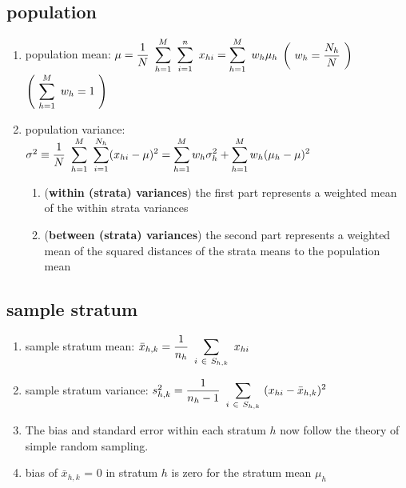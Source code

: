 \subsection{population}
\begin{enumerate}[itemsep=0.2cm]
    \item population mean: $
        \mu
        = \dfrac{1}{N} \ \displaystyle\sum_{h=1}^M \ \displaystyle\sum_{i=1}^n\  x_{hi}
        = \displaystyle\sum_{h=1}^M \ w_h\mu_h
    $
    \hfill
    $\left(\ w_h = \dfrac{N_h}{N} \ \right)$
    \hfill
    $\dParenBrac{\ \dsum_{h=1}^M \ w_h = 1 \ }$
    \hfill \cite{statistics/book/Statistics-for-Data-Scientists/Maurits-Kaptein}

    \item population variance: $
        \sigma^2
        \equiv \dfrac{1}{N} \ \displaystyle\sum_{h=1}^M \ \displaystyle\sum_{i=1}^{N_h} (x_{hi} - \mu)^2
        = \displaystyle\sum_{h=1}^M w_h \sigma_h^2 + \displaystyle\sum_{h=1}^M w_h (\mu_h - \mu)^2
    $
    \hfill \cite{statistics/book/Statistics-for-Data-Scientists/Maurits-Kaptein}
    \begin{enumerate}
        \item (\textbf{within (strata) variances}) the first part represents a weighted mean of the within strata variances
        
        \item (\textbf{between (strata) variances}) the second part represents a weighted mean of the squared distances of the strata means to the population mean
    \end{enumerate}

\end{enumerate}


\subsection{sample stratum}
\begin{enumerate}[itemsep=0.2cm]
    \item sample stratum mean: $
        \bar{x}_{h,k} = \dfrac{1}{n_h} \ \displaystyle\sum_{i \ \in \ S_{h,k}} \ x_{hi}
    $
    \hfill \cite{statistics/book/Statistics-for-Data-Scientists/Maurits-Kaptein}

    \item sample stratum variance: $
        s^2_{h,k} = \dfrac{1}{n_h-1} \ \displaystyle\sum_{i \ \in \ S_{h,k}} \ (x_{hi} - \bar{x}_{h,k})^2
    $
    \hfill \cite{statistics/book/Statistics-for-Data-Scientists/Maurits-Kaptein}

    \item The bias and standard error within each stratum $h$ now follow the theory of simple random sampling.
    \hfill \cite{statistics/book/Statistics-for-Data-Scientists/Maurits-Kaptein}

    \item bias of $\bar{x}_{h,k}$ = 0 in stratum $h$ is zero for the stratum mean $\mu_h$

\end{enumerate}













